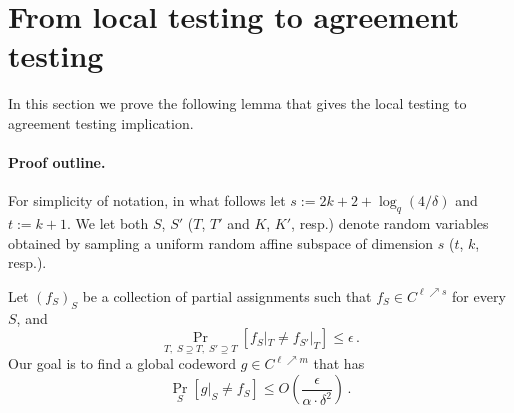 \documentclass{toc}
\theoremstyle{plain}
\DeclareMathOperator{\mindist}{mindist}  %
\newcommand{\F}{{\mathbb{F}}}
\begin{document}
\section{From local testing to agreement testing}\label{sec:testing-to-agreement}

In this section we prove the following lemma that gives the local testing to agreement testing implication.


\paragraph{Proof outline.}
For simplicity of notation, in what follows let $s:=2k+2+\log_q(4/\delta)$ and $t:=k+1$.
We let both $S$, $S'$ ($T$, $T'$ and $K$, $K'$, resp.) denote random variables obtained by sampling a uniform random affine subspace of dimension $s$ ($t$, $k$, resp.).

Let  $(f_S)_S$ be a collection of partial assignments such that  $f_S \in C^{\ell \nearrow s}$ for every $S$, and
\begin{equation}\label{eq:assumption}
\Pr_{T, \; S \supseteq T,\;S' \supseteq T}[f_S|_T \neq f_{S'}|_T] \leq \epsilon\,.
\end{equation}
Our goal is to find a global codeword $g \in C^{\ell \nearrow m}$ that has
\begin{equation}\label{eq:conclusion}
 \Pr_S[g|_S \neq f_S] \leq O\left(\frac{\epsilon} {\alpha \cdot \delta^2}\right)\,.
 \end{equation}
\end{document}
